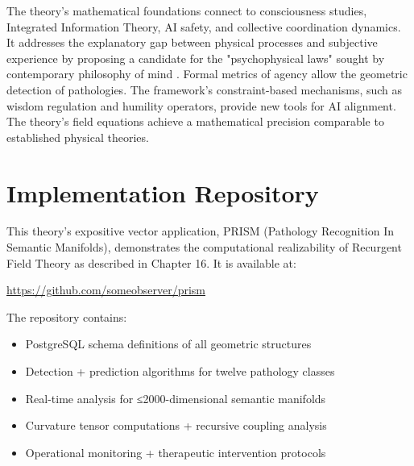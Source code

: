 \documentclass[11pt, a4paper]{report}
\begin{document}
\vspace{1em}

The theory's mathematical foundations connect to consciousness studies, Integrated Information Theory, AI safety, and collective coordination dynamics. It addresses the explanatory gap between physical processes and subjective experience by proposing a candidate for the "psychophysical laws" sought by contemporary philosophy of mind \autocite{Chalmers1996}. Formal metrics of agency allow the geometric detection of pathologies. The framework's constraint-based mechanisms, such as wisdom regulation and humility operators, provide new tools for AI alignment. The theory's field equations achieve a mathematical precision comparable to established physical theories.

\tableofcontents

















\appendix
\chapter{Implementation Repository}
\label{appendix:implementation}

This theory's expositive vector application, PRISM (Pathology Recognition In Semantic Manifolds), demonstrates the computational realizability of Recurgent Field Theory as described in Chapter 16. It is available at:

\begin{center}
\url{https://github.com/someobserver/prism}
\end{center}

The repository contains:
\begin{itemize}
\item PostgreSQL schema definitions of all geometric structures
\item Detection + prediction algorithms for twelve pathology classes
\item Real-time analysis for ≤2000-dimensional semantic manifolds
\item Curvature tensor computations + recursive coupling analysis
\item Operational monitoring + therapeutic intervention protocols
\end{itemize}

\printbibliography
\end{document}
